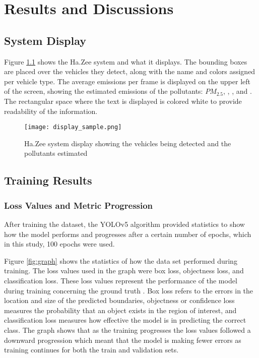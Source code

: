 \chapter{Results and Discussions}

\section{System Display}

Figure \ref{fig:display} shows the Ha.Zee system and what it displays. The bounding boxes are placed over the vehicles they detect, along with the name and colors assigned per vehicle type. The average emissions per frame is displayed on the upper left of the screen, showing the estimated emissions of the pollutants: $PM_{2.5}$, , , and . The rectangular space where the text is displayed is colored white to provide readability of the information.

\begin{figure}[!htbp]
	\texttt{[image: display\_sample.png]}
	\caption{Ha.Zee system display showing the vehicles being detected and the pollutants estimated}
	\label{fig:display}
\end{figure}
\FloatBarrier


\section{Training Results}

\subsection{Loss Values and Metric Progression}
After training the dataset, the YOLOv5 algorithm provided statistics to show how the model performs and progresses after a certain number of epochs, which in this study, 100 epochs were used.



Figure \ref{fig:graph} shows the statistics of how the data set performed during training. The loss values used in the graph were box loss, objectness loss, and classification loss. These loss values represent the performance of the model during training concerning the ground truth \cite{
Hui_2022}. Box loss refers to the errors in the location and size of the predicted boundaries, objectness or confidence loss measures the probability that an object exists in the region of interest, and classification loss measures how effective the model is in predicting the correct class. The graph shows that as the training progresses the loss values followed a downward progression which meant that the model is making fewer errors as training continues for both the train and validation sets.

